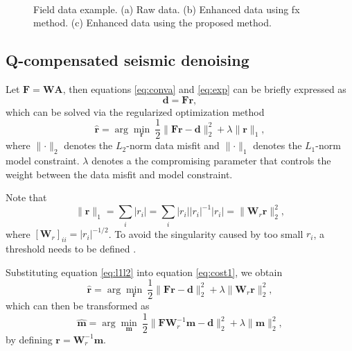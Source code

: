 \begin{figure}[htb!]
 \centering
 \\
  \caption{Field data example. (a) Raw data. (b) Enhanced data using fx method. (c) Enhanced data using the proposed method.}
  \label{fig:real-dn-0,real-d2-0,real-d1-0}
\end{figure}

\subsection{Q-compensated seismic denoising}
Let $\mathbf{F}=\mathbf{WA}$, then equations \ref{eq:conva} and \ref{eq:exp} can be briefly expressed as
\begin{equation}
\label{eq:inv}
\mathbf{d} = \mathbf{Fr},
\end{equation}
which can be solved via the regularized optimization method
\begin{equation}
\label{eq:cost1}
\hat{\mathbf{r}} = \arg \min_{\mathbf{r}} \ \frac{1}{2} \parallel \mathbf{F} \mathbf{r}-\mathbf{d}\parallel_2^2+ \lambda \parallel\mathbf{r}\parallel_1,
\end{equation}
where $\parallel\cdot \parallel_2$ denotes the $L_2$-norm data misfit and $\parallel\cdot \parallel_1$ denotes the $L_1$-norm model constraint. $\lambda$ denotes a the compromising parameter that controls the weight between the data misfit and model constraint. 

Note that 
\begin{equation}
\label{eq:l1l2}
\parallel \mathbf{r} \parallel_1 = \sum_{i} |r_i| =  \sum_{i} |r_i| |r_i|^{-1} |r_i| = \parallel \mathbf{W}_r\mathbf{r} \parallel_2^2,
\end{equation}
where $[\mathbf{W}_r]_{ii}=|r_i|^{-1/2}$. To avoid the singularity caused by too small $r_i$, a threshold needs to be defined \cite[]{amr2014}. 

Substituting equation \ref{eq:l1l2} into equation \ref{eq:cost1}, we obtain
\begin{equation}
\label{eq:cost2}
\hat{\mathbf{r}} = \arg \min_{\mathbf{r}} \ \frac{1}{2} \parallel \mathbf{F} \mathbf{r}-\mathbf{d}\parallel_2^2+ \lambda \parallel \mathbf{W}_r\mathbf{r} \parallel_2^2,
\end{equation}
which can then be transformed as
\begin{equation}
\label{eq:cost2}
\hat{\mathbf{m}} = \arg \min_{\mathbf{m}} \ \frac{1}{2} \parallel \mathbf{F} \mathbf{W}_r^{-1}\mathbf{m}-\mathbf{d}\parallel_2^2+ \lambda \parallel \mathbf{m} \parallel_2^2,
\end{equation}
by defining $\mathbf{r}=\mathbf{W}_r^{-1}\mathbf{m}$.

